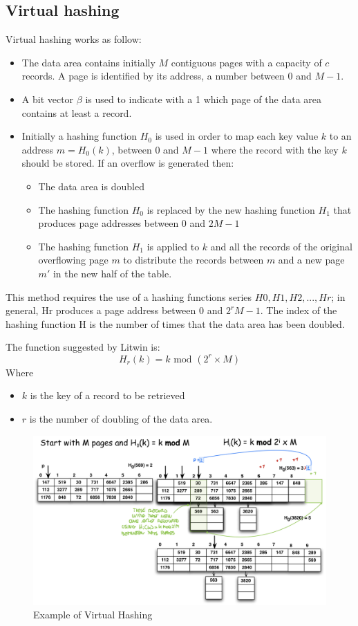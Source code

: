 \subsection{Virtual hashing}
Virtual hashing works as follow:
\begin{itemize}
    \item The data area contains initially \(M\) contiguous pages with a capacity of \(c\) records. A page is identified by its address, a number between \(0\) and \(M - 1\).
    \item A bit vector \(\beta\) is used to indicate with a 1 which page of the data area contains at least a record.
    \item  Initially a hashing function \(H_0\) is used in order to map each key value \(k\) to an address \(m = H_0(k)\), between \(0\) and \(M - 1\) where the record with the key \(k\) should be stored. If an overflow is generated then:
    \begin{itemize}
        \item The data area is doubled
        \item The hashing function \(H_0\) is replaced by the new hashing function \(H_1\) that produces page addresses between \(0\) and \(2M - 1\)
        \item The hashing function \(H_1\) is applied to \(k\) and all the records of the original overflowing page \(m\) to distribute the records between \(m\) and a new page \(m'\) in the new half of the table.
    \end{itemize}
\end{itemize}

This method requires the use of a hashing functions series \(H0, H1, H2, ..., Hr\); in general, Hr produces a page address between \(0\) and \(2^rM - 1\). The index of the hashing function H is the number of times that the data area has been doubled.

The function suggested by Litwin is:
\[H_r(k) = k\text{ mod }(2^r \times M)\]
Where
\begin{itemize}
    \item \(k\) is the key of a record to be retrieved
    \item \(r\) is the number of doubling of the data area.
\end{itemize}

\begin{figure}[!h]
    \centering
    \includegraphics[width=0.8\linewidth]{images/DBMS_Internals/HashingOrganization/virtual_hashing.jpeg}
    \caption{Example of Virtual Hashing}
\end{figure}

